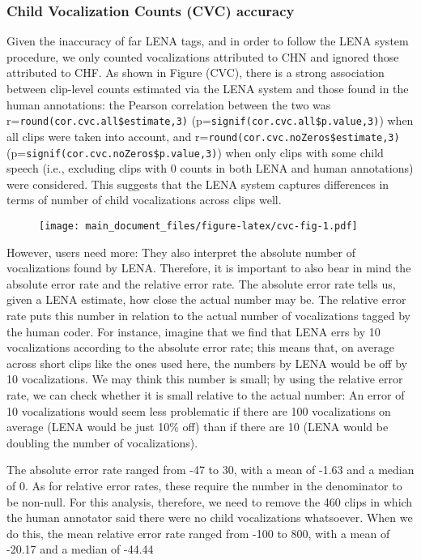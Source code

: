 \documentclass[english,floatsintext,man]{apa6}
\begin{document}
\subsubsection{Child Vocalization Counts (CVC)
accuracy}\label{child-vocalization-counts-cvc-accuracy}

Given the inaccuracy of far LENA tags, and in order to follow the LENA
system procedure, we only counted vocalizations attributed to CHN and
ignored those attributed to CHF. As shown in Figure (CVC), there is a
strong association between clip-level counts estimated via the LENA
system and those found in the human annotations: the Pearson correlation
between the two was r=\texttt{round(cor.cvc.all\$estimate,3)}
(p=\texttt{signif(cor.cvc.all\$p.value,3)}) when all clips were taken
into account, and r=\texttt{round(cor.cvc.noZeros\$estimate,3)}
(p=\texttt{signif(cor.cvc.noZeros\$p.value,3)}) when only clips with
some child speech (i.e., excluding clips with 0 counts in both LENA and
human annotations) were considered. This suggests that the LENA system
captures differences in terms of number of child vocalizations across
clips well.

\begin{figure}
\centering
\texttt{[image: main\_document\_files/figure-latex/cvc-fig-1.pdf]}
\caption{}
\end{figure}

However, users need more: They also interpret the absolute number of
vocalizations found by LENA. Therefore, it is important to also bear in
mind the absolute error rate and the relative error rate. The absolute
error rate tells us, given a LENA estimate, how close the actual number
may be. The relative error rate puts this number in relation to the
actual number of vocalizations tagged by the human coder. For instance,
imagine that we find that LENA errs by 10 vocalizations according to the
absolute error rate; this means that, on average across short clips like
the ones used here, the numbers by LENA would be off by 10
vocalizations. We may think this number is small; by using the relative
error rate, we can check whether it is small relative to the actual
number: An error of 10 vocalizations would seem less problematic if
there are 100 vocalizations on average (LENA would be just 10\% off)
than if there are 10 (LENA would be doubling the number of
vocalizations).

The absolute error rate ranged from -47 to 30, with a mean of -1.63 and
a median of 0. As for relative error rates, these require the number in
the denominator to be non-null. For this analysis, therefore, we need to
remove the 460 clips in which the human annotator said there were no
child vocalizations whatsoever. When we do this, the mean relative error
rate ranged from -100 to 800, with a mean of -20.17 and a median of
-44.44
\end{document}
